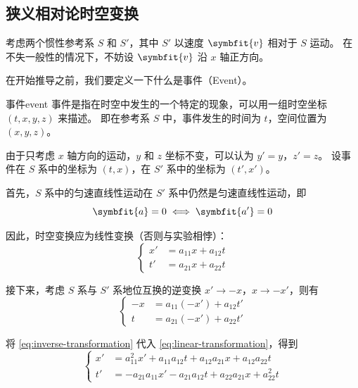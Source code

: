 \subsection{狭义相对论时空变换}

考虑两个惯性参考系 $S$ 和 $S'$，其中 $S'$ 以速度 $\symbfit{v}$ 相对于 $S$ 运动。
在不失一般性的情况下，不妨设 $\symbfit{v}$ 沿 $x$ 轴正方向。

在开始推导之前，我们要定义一下什么是事件（Event）。
\begin{definition}{事件}{event}
    事件是指在时空中发生的一个特定的现象，可以用一组时空坐标 $(t, x, y, z)$ 来描述。
    即在参考系 $S$ 中，事件发生的时间为 $t$，空间位置为 $(x, y, z)$。
\end{definition}

由于只考虑 $x$ 轴方向的运动，$y$ 和 $z$ 坐标不变，可以认为 $y' = y$，$z' = z$。
设事件在 $S$ 系中的坐标为 $(t, x)$，在 $S'$ 系中的坐标为 $(t', x')$。

首先，$S$ 系中的匀速直线性运动在 $S'$ 系中仍然是匀速直线性运动，即
\begin{equation}
    \symbfit{a} = 0 \iff \symbfit{a'} = 0
\end{equation}

因此，时空变换应为线性变换（否则与实验相悖）：
\begin{equation}
    \left\{
    \begin{aligned}
        x' & = a_{11} x + a_{12} t \\
        t' & = a_{21} x + a_{22} t
    \end{aligned}
    \right.
    \label{eq:linear-transformation}
\end{equation}

接下来，考虑 $S$ 系与 $S'$ 系地位互换的逆变换 $x' \to -x$，$x \to -x'$，则有
\begin{equation}
    \left\{
    \begin{aligned}
        -x & = a_{11} (-x') + a_{12} t' \\
        t  & = a_{21} (-x') + a_{22} t'
    \end{aligned}
    \right.
    \label{eq:inverse-transformation}
\end{equation}

将 \cref{eq:inverse-transformation} 代入 \cref{eq:linear-transformation}，得到
\begin{equation}
    \left\{
    \begin{aligned}
        x' & = a_{11}^2 x' + a_{11} a_{12} t + a_{12} a_{21} x + a_{12} a_{22} t  \\
        t' & = -a_{21} a_{11} x' - a_{21} a_{12} t + a_{22} a_{21} x + a_{22}^2 t
    \end{aligned}
    \right.
\end{equation}

